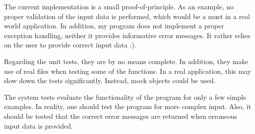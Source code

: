 \documentclass[12pt]{article}
\begin{document}
The current implementation is a small proof-of-principle. As an
example, no proper validation of the input data is performed, which
would be a must in a real world application. In addition, my program
does not implement a proper exception handling, neither it provides
informative error messages. It rather relies on the user to provide
correct input data :).

\vspace{0.2cm} 

Regarding the unit tests, they are by no means complete. In addition,
they make use of real files when testing some of the functions. In a
real application, this may slow down the tests significantly. Instead,
mock objects could be used.

\vspace{0.2cm} 

The system tests evaluate the functionality of the program for only a
few simple examples. In reality, one should test the program for more
complex input. Also, it should be tested that the correct error
messages are returned when erroneous input data is provided.
\end{document}
